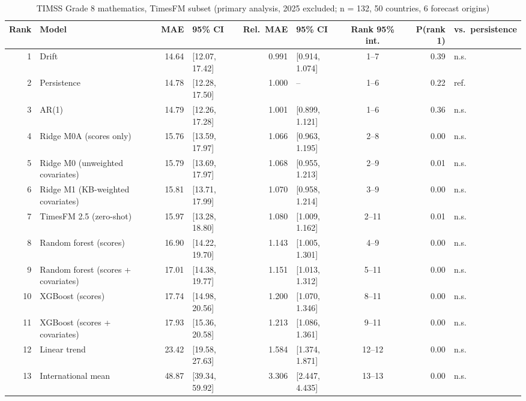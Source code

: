 \begin{table}[htbp]
\centering
\footnotesize
\caption{TIMSS Grade 8 mathematics, TimesFM subset (primary analysis, 2025 excluded; n = 132, 50 countries, 6 forecast origins)}
\label{tab:A13}
\begin{tabular}{rlrlrlcrl}
\toprule
Rank & Model & MAE & 95\% CI & Rel.\ MAE & 95\% CI & Rank 95\% int. & P(rank 1) & vs.\ persistence \\
\midrule
1 & Drift & 14.64 & [12.07, 17.42] & 0.991 & [0.914, 1.074] & 1--7 & 0.39 & n.s. \\
2 & Persistence & 14.78 & [12.28, 17.50] & 1.000 & -- & 1--6 & 0.22 & ref. \\
3 & AR(1) & 14.79 & [12.26, 17.28] & 1.001 & [0.899, 1.121] & 1--6 & 0.36 & n.s. \\
4 & Ridge M0A (scores only) & 15.76 & [13.59, 17.97] & 1.066 & [0.963, 1.195] & 2--8 & 0.00 & n.s. \\
5 & Ridge M0 (unweighted covariates) & 15.79 & [13.69, 17.97] & 1.068 & [0.955, 1.213] & 2--9 & 0.01 & n.s. \\
6 & Ridge M1 (KB-weighted covariates) & 15.81 & [13.71, 17.99] & 1.070 & [0.958, 1.214] & 3--9 & 0.00 & n.s. \\
7 & TimesFM 2.5 (zero-shot) & 15.97 & [13.28, 18.80] & 1.080 & [1.009, 1.162] & 2--11 & 0.01 & n.s. \\
8 & Random forest (scores) & 16.90 & [14.22, 19.70] & 1.143 & [1.005, 1.301] & 4--9 & 0.00 & n.s. \\
9 & Random forest (scores + covariates) & 17.01 & [14.38, 19.77] & 1.151 & [1.013, 1.312] & 5--11 & 0.00 & n.s. \\
10 & XGBoost (scores) & 17.74 & [14.98, 20.56] & 1.200 & [1.070, 1.346] & 8--11 & 0.00 & n.s. \\
11 & XGBoost (scores + covariates) & 17.93 & [15.36, 20.58] & 1.213 & [1.086, 1.361] & 9--11 & 0.00 & n.s. \\
12 & Linear trend & 23.42 & [19.58, 27.63] & 1.584 & [1.374, 1.871] & 12--12 & 0.00 & n.s. \\
13 & International mean & 48.87 & [39.34, 59.92] & 3.306 & [2.447, 4.435] & 13--13 & 0.00 & n.s. \\
\bottomrule
\end{tabular}
\par{}
\end{table}
